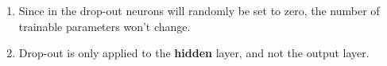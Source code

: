 \documentclass[12pt]{article}
\begin{document}
\begin{enumerate}
    \item Since in the drop-out neurons will randomly be set to zero, the number of trainable parameters won't change.

    \item Drop-out is only applied to the \textbf{hidden} layer, and not the output layer.
\end{enumerate}

     
\end{document}

